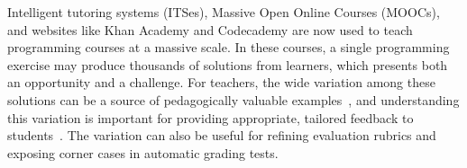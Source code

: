 Intelligent tutoring systems (ITSes), Massive Open Online Courses (MOOCs), and websites like Khan Academy and Codecademy are now used to teach programming courses at a massive scale. In these courses, a single programming exercise may produce thousands of solutions from learners, which presents both an opportunity and a challenge. For teachers, the wide variation among these solutions can be a source of pedagogically valuable examples~\cite{marton13}, and understanding this variation is important for providing appropriate, tailored feedback to students~\cite{basupowergrading,MOOCshop}. The variation can also be useful for refining evaluation rubrics and exposing corner cases in automatic grading tests.

